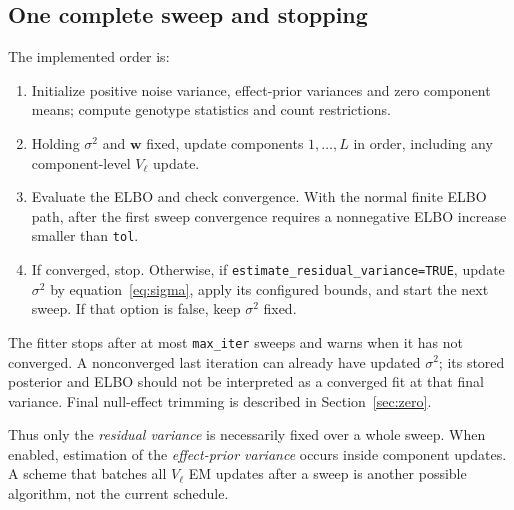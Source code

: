 \documentclass[11pt]{article}
\begin{document}
\subsection{One complete sweep and stopping}
The implemented order is:
\begin{enumerate}
 \item Initialize positive noise variance, effect-prior variances and
 zero component means; compute genotype statistics and count restrictions.
 \item Holding $\sigma^2$ and $\mathbf w$ fixed, update components
 $1,\ldots,L$ in order, including any component-level $V_\ell$ update.
 \item Evaluate the ELBO and check convergence. With the normal finite
 ELBO path, after the first sweep convergence requires a nonnegative
 ELBO increase smaller than \texttt{tol}.
 \item If converged, stop. Otherwise, if
 \texttt{estimate\_residual\_variance=TRUE}, update $\sigma^2$ by
 equation~\eqref{eq:sigma}, apply its configured bounds, and start
 the next sweep. If that option is false, keep $\sigma^2$ fixed.
\end{enumerate}
The fitter stops after at most \texttt{max\_iter} sweeps and warns when
it has not converged. A nonconverged last iteration can already have
updated $\sigma^2$; its stored posterior and ELBO should not be interpreted
as a converged fit at that final variance. Final null-effect trimming is
described in Section~\ref{sec:zero}.

Thus only the \emph{residual variance} is necessarily fixed over a whole
sweep. When enabled, estimation of the \emph{effect-prior variance} occurs
inside component updates. A scheme that batches all $V_\ell$ EM updates
after a sweep is another possible algorithm, not the current schedule.
\end{document}
